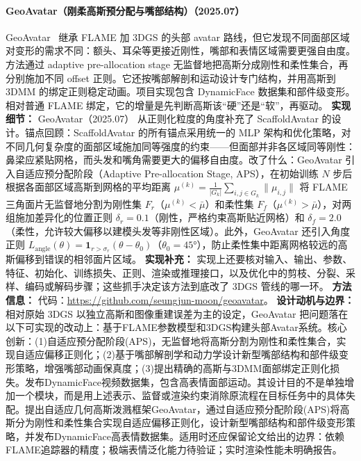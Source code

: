 \paragraph{GeoAvatar（刚柔高斯预分配与嘴部结构）（2025.07）}
GeoAvatar~\cite{2507_18155} 继承 FLAME 加 3DGS 的头部 avatar 路线，但它发现不同面部区域对变形的需求不同：额头、耳朵等更接近刚性，嘴部和表情区域需要更强自由度。方法通过 adaptive pre-allocation stage 无监督地把高斯分成刚性和柔性集合，再分别施加不同 offset 正则。它还按嘴部解剖和运动设计专门结构，并用高斯到 3DMM 的绑定正则稳定动画。项目实现包含 DynamicFace 数据集和部件级变形。相对普通 FLAME 绑定，它的增量是先判断高斯该“硬”还是“软”，再驱动。
\textbf{实现细节：} GeoAvatar（2025.07） 从正则化粒度的角度补充了 ScaffoldAvatar 的设计。锚点回顾：ScaffoldAvatar 的所有锚点采用统一的 MLP 架构和优化策略，对不同几何复杂度的面部区域施加同等强度的约束——但面部并非各区域同等刚性：鼻梁应紧贴网格，而头发和嘴角需要更大的偏移自由度。改了什么：GeoAvatar 引入自适应预分配阶段（Adaptive Pre-allocation Stage, APS），在初始训练 $N$ 步后根据各面部区域高斯到网格的平均距离 $\mu^{(k)} = \frac{1}{|G_k|} \sum_{i,j \in G_k} \| \mu_{i,j} \|$ 将 FLAME 三角面片无监督地分割为刚性集 $F_r$（$\mu^{(k)} < \bar\mu$）和柔性集 $F_f$（$\mu^{(k)} > \bar\mu$），对两组施加差异化的位置正则 $\delta_r=0.1$（刚性，严格约束高斯贴近网格）和 $\delta_f=2.0$（柔性，允许较大偏移以建模头发等非刚性区域）。此外，GeoAvatar 还引入角度正则 $L_{\mathrm{angle}}(\theta) = \mathbf{1}_{r > \sigma_r}(\theta - \theta_0)$（$\theta_0 = 45°$），防止柔性集中距离网格较远的高斯偏移到错误的相邻面片区域。
\textbf{实现补充：} 实现上还要核对输入、输出、参数、特征、初始化、训练损失、正则、渲染或推理接口，以及优化中的剪枝、分裂、采样、编码或解码步骤；这些抓手决定该方法到底改了 3DGS 管线的哪一环。
\textbf{方法信息：} 代码：\url{https://github.com/seungjun-moon/geoavatar}。
\textbf{设计动机与边界：} 相对原始 3DGS 以独立高斯和图像重建误差为主的设定，GeoAvatar 把问题落在以下可实现的改动上：基于FLAME参数模型和3DGS构建头部Avatar系统。核心创新：(1)自适应预分配阶段(APS)，无监督地将高斯分割为刚性和柔性集合，实现自适应偏移正则化；(2)基于嘴部解剖学和动力学设计新型嘴部结构和部件级变形策略，增强嘴部动画保真度；(3)提出精确的高斯与3DMM面部绑定正则化损失。发布DynamicFace视频数据集，包含高表情面部运动。其设计目的不是单独增加一个模块，而是用上述表示、监督或渲染约束消除原流程在目标任务中的具体失配。提出自适应几何高斯泼溅框架GeoAvatar，通过自适应预分配阶段(APS)将高斯分为刚性和柔性集合实现自适应偏移正则化，设计新型嘴部结构和部件级变形策略，并发布DynamicFace高表情数据集。适用时还应保留论文给出的边界：依赖FLAME追踪器的精度；极端表情泛化能力待验证；实时渲染性能未明确报告。
